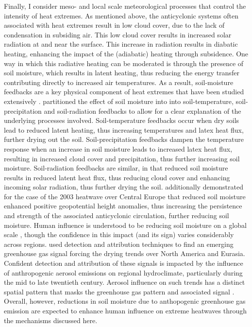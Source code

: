   Finally, I consider meso- and local scale meteorological processes that control the intensity of heat extremes. As mentioned above, the anticyclonic systems often associated with heat extremes result in low cloud cover, due to the lack of condensation in subsiding air. This low cloud cover results in increased solar radiation at and near the surface. This increase in radiation results in diabatic heating, enhancing the impact of the (adiabatic) heating through subsidence. One way in which this radiative heating can be moderated is through the presence of soil moisture, which results in latent heating, thus reducing the energy transfer contributing directly to increased air temperatures. As a result, soil-moisture feedbacks are a key physical component of heat extremes that have been studied extensively \citep{horton_review_2016,wehrli_identifying_2019,zeppetello_physics_2022,vogel_varying_2018,fischer_contribution_2007,fischer_soil_2007,miralles_mega-heatwave_2014,sousa_distinct_2020}. \citet{vogel_varying_2018} partitioned the effect of soil moisture into into soil-temperature, soil-precipitation and soil-radiation feedbacks to allow for a clear explanation of the underlying processes involved. Soil-temperature feedbacks occur when dry soils lead to reduced latent heating, thus increasing temperatures and latex heat flux, further drying out the soil. Soil-precipitation feedbacks dampen the temperature response when an increase in soil moisture leads to increased latex heat flux, resulting in increased cloud cover and precipitation, thus further increasing soil moisture. Soil-radiation feedbacks are similar, in that reduced soil moisture results in reduced latent heat flux, thus reducing cloud cover and enhancing incoming solar radiation, thus further drying the soil. \citet{fischer_soil_2007} additionally demonstrated for the case of the 2003 heatwave over Central Europe that reduced soil moisture enhanced positive geopotential height anomalies, thus increasing the persistence and strength of the associated anticyclonic circulation, further reducing soil moisture. Human influence is understood to be reducing soil moisture on a global scale \citep{gu_attribution_2019}, though the confidence in this impact (and its sign) varies considerably across regions. \citet{marvel_twentieth-century_2019} used detection and attribution techniques to find an emerging greenhouse gas signal forcing the drying trends over North America and Eurasia. Confident detection and attribution of these signals is impacted by the influence of anthropogenic aerosol emissions on regional hydroclimate, particularly during the mid to late twentieth century. Aerosol influence on such trends has a distinct spatial pattern that masks the greenhouse gas pattern and associated signal \citep{bonfils_human_2020}. Overall, however, reductions in soil moisture due to anthopogenic greenhouse gas emission are expected to enhance human influence on extreme heatwaves through the mechanisms discussed here.

